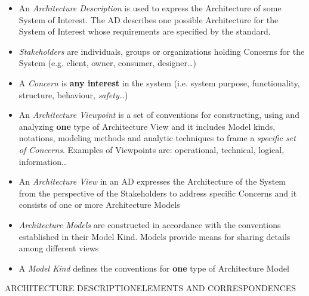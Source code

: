 		\begin{frame}
			\begin{itemize}
				\item An \emph{Architecture Description} is used to express the Architecture of some System of Interest. The AD describes one possible Architecture for the System of Interest whose requirements are specified by the standard.
				\item \emph{Stakeholders} are individuals, groups or organizations holding Concerns for the System (e.g. client, owner, consumer, designer\dots)
				\item A \emph{Concern} is \textbf{any interest} in the system (i.e. system purpose, functionality, structure, behaviour, \emph{safety}\dots)
				\item An \emph{Architecture Viewpoint} is a set of conventions for constructing, using and analyzing \textbf{one} type of Architecture View and it includes Model kinds, notations, modeling methods and analytic techniques to frame a \emph{specific set of Concerns}. Examples of Viewpoints are: operational, technical, logical, information\dots
				\item An \emph{Architecture View} in an AD expresses the Architecture of the System from the perspective of the Stakeholders to address specific Concerns and it consists of one or more Architecture Models
				\item \emph{Architecture Models} are constructed in accordance with the conventions established in their Model Kind. Models provide means for sharing details among different views
				\item A \emph{Model Kind} defines the conventions for \textbf{one} type of Architecture Model
			\end{itemize}
		\end{frame}
		
	\begin{frame}
		\begin{center}
				\begin{LARGE}
					ARCHITECTURE DESCRIPTION\newline\newline ELEMENTS AND CORRESPONDENCES
				\end{LARGE}
			\end{center}
		\end{frame}
		

